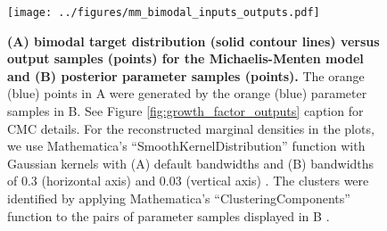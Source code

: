 \documentclass[10pt,letterpaper]{article}
\begin{document}
\begin{figure}[H]
	\centerline{\texttt{[image: ../figures/mm\_bimodal\_inputs\_outputs.pdf]}}
	\caption{\textbf{(A) bimodal target distribution (solid contour lines) versus output samples (points) for the Michaelis-Menten model and (B) posterior parameter samples (points).} The orange (blue) points in A were generated by the orange (blue) parameter samples in B. See Figure \ref{fig:growth_factor_outputs} caption for CMC details. For the reconstructed marginal densities in the plots, we use Mathematica's ``SmoothKernelDistribution'' function with Gaussian kernels with (A) default bandwidths and (B) bandwidths of 0.3 (horizontal axis) and 0.03 (vertical axis) \cite{mathematica}. The clusters were identified by applying Mathematica's ``ClusteringComponents'' function to the pairs of parameter samples displayed in B \cite{mathematica}.}
	\label{fig:mm_bimodal_inputs_outputs}
\end{figure}
\end{document}
